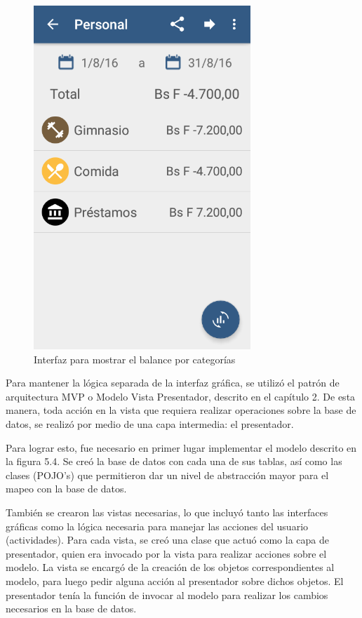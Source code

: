 \begin{figure}[ht]
  \centering
  \includegraphics[scale=0.45,type=png,ext=.png,read=.png]{imagenes/categories_report}
  \caption{Interfaz para mostrar el balance por categorías}
  \label{fig:interfazReporteCategorias}
\end{figure}

Para mantener la lógica separada de la interfaz gráfica, se utilizó el patrón de arquitectura MVP o Modelo Vista Presentador, descrito en el capítulo 2. De esta manera, toda acción en la vista que requiera realizar operaciones sobre la base de datos, se realizó por medio de una capa intermedia: el presentador. 

Para lograr esto, fue necesario en primer lugar implementar el modelo descrito en la figura 5.4. Se creó la base de datos con cada una de sus tablas, así como las clases (POJO's) que permitieron dar un nivel de abstracción mayor para el mapeo con la base de datos.

También se crearon las vistas necesarias, lo que incluyó tanto las interfaces gráficas como la lógica necesaria para manejar las acciones del usuario (actividades). Para cada vista, se creó una clase que actuó como la capa de presentador, quien era invocado por la vista para realizar acciones sobre el modelo. La vista se encargó de la creación de los objetos correspondientes al modelo, para luego pedir alguna acción al presentador sobre dichos objetos. El presentador tenía la función de invocar al modelo para realizar los cambios necesarios en la base de datos.

